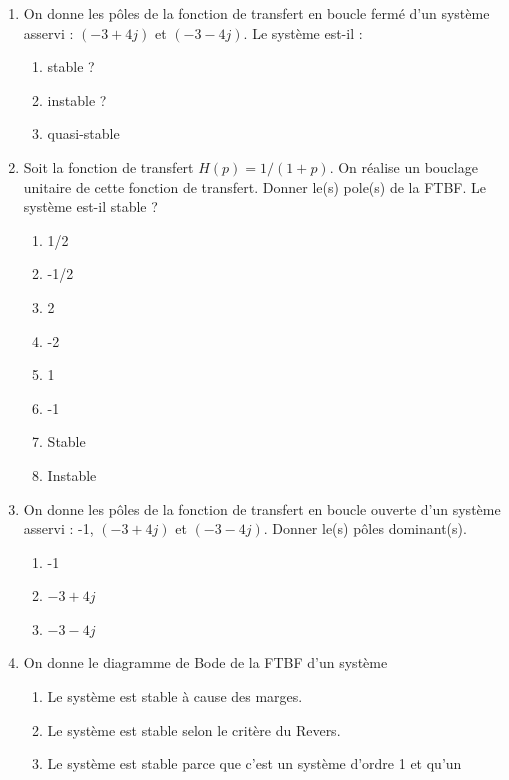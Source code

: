 \documentclass[10pt,fleqn]{article} %
\begin{document}
\def\pathfig{images}

\vspace{4.5cm}
\pagestyle{fancy}
\thispagestyle{plain}

\def\columnseprulecolor{\color{ocre}}
\setlength{\columnseprule}{0.4pt} 

\def\pathfig{images}

\begin{multicols}{2}
\begin{enumerate}
\item On donne les pôles de la fonction de transfert en boucle fermé d'un système
asservi : $(-3+4j)$ et $(-3-4j)$. Le système est-il :
\begin{enumerate}
\item stable ?
\item  instable ?
\item  quasi-stable 
\end{enumerate}
\item Soit la fonction de transfert $H(p)=1/(1+p)$. On réalise un bouclage unitaire de
cette fonction de transfert. Donner le(s) pole(s) de la FTBF. Le système est-il stable ?
\begin{enumerate}
\item 1/2
\item  -1/2
\item  2
\item  -2
\item  1
\item  -1
\item  Stable
\item  Instable
\end{enumerate}
\item On donne les pôles de la fonction de transfert en boucle ouverte d'un système
asservi : -1, $(-3+4j)$ et $(-3-4j)$. Donner le(s) pôles dominant(s).
\begin{enumerate}
\item -1
\item  $-3+4j$
\item  $-3-4j$
\end{enumerate}
\item On donne le diagramme de Bode de la FTBF d'un système
\begin{enumerate}
\item Le système est stable à cause des marges.
\item Le système est stable selon le critère du Revers.
\item Le système est stable parce que c'est un système d'ordre 1 et qu'un

\end{enumerate}
\end{enumerate}
\end{multicols}
\end{document}
